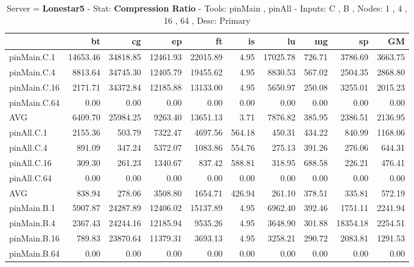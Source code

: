 \begin{table*}[]
\caption{Server = \textbf{Lonestar5} - Stat: \textbf{Compression Ratio} - 
 Tools: pinMain , pinAll -
 Inputs: C , B ,  
 Nodes: 1 , 4 , 16 , 64 ,  
 Desc: Primary}
\label{ls5_cr_pMpA_BC_itn_p3.5}\begin{center}
\begin{tabular}{lrrrrrrrrr}
\hline
              &       bt &       cg &       ep &       ft &      is &       lu &     mg &       sp &      GM \\
\hline
 pinMain.C.1  & 14653.46 & 34818.85 & 12461.93 & 22015.89 &    4.95 & 17025.78 & 726.71 &  3786.69 & 3663.75 \\
 pinMain.C.4  &  8813.64 & 34745.30 & 12405.79 & 19455.62 &    4.95 &  8830.53 & 567.02 &  2504.35 & 2868.80 \\
 pinMain.C.16 &  2171.71 & 34372.84 & 12185.88 & 13133.00 &    4.95 &  5650.97 & 250.08 &  3255.01 & 2015.23 \\
 pinMain.C.64 &     0.00 &     0.00 &     0.00 &     0.00 &    0.00 &     0.00 &   0.00 &     0.00 &    0.00 \\
 AVG          &  6409.70 & 25984.25 &  9263.40 & 13651.13 &    3.71 &  7876.82 & 385.95 &  2386.51 & 2136.95 \\
 pinAll.C.1   &  2155.36 &   503.79 &  7322.47 &  4697.56 &  564.18 &   450.31 & 434.22 &   840.99 & 1168.06 \\
 pinAll.C.4   &   891.09 &   347.24 &  5372.07 &  1083.86 &  554.76 &   275.13 & 391.26 &   276.06 &  644.31 \\
 pinAll.C.16  &   309.30 &   261.23 &  1340.67 &   837.42 &  588.81 &   318.95 & 688.58 &   226.21 &  476.41 \\
 pinAll.C.64  &     0.00 &     0.00 &     0.00 &     0.00 &    0.00 &     0.00 &   0.00 &     0.00 &    0.00 \\
 AVG          &   838.94 &   278.06 &  3508.80 &  1654.71 &  426.94 &   261.10 & 378.51 &   335.81 &  572.19 \\
 pinMain.B.1  &  5907.87 & 24287.89 & 12406.02 & 15137.89 &    4.95 &  6962.40 & 392.46 &  1751.11 & 2241.94 \\
 pinMain.B.4  &  2367.43 & 24244.16 & 12185.94 &  9535.26 &    4.95 &  3648.90 & 301.88 & 18354.18 & 2254.51 \\
 pinMain.B.16 &   789.83 & 23870.64 & 11379.31 &  3693.13 &    4.95 &  3258.21 & 290.72 &  2083.81 & 1291.53 \\
 pinMain.B.64 &     0.00 &     0.00 &     0.00 &     0.00 &    0.00 &     0.00 &   0.00 &     0.00 &    0.00 \\

\end{tabular}
\end{center}
\end{table*}
